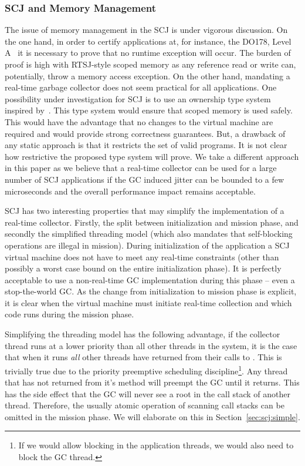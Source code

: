 \subsubsection{SCJ and Memory Management}

The issue of memory management in the SCJ is under vigorous
discussion.  On the one hand, in order to certify applications at,
for instance, the DO178, Level A~\cite{do-178b} it is necessary to
prove that no runtime exception will occur. The burden of proof is
high with RTSJ-style scoped memory as any reference read or write
can, potentially, throw a memory access exception. On the other
hand, mandating a real-time garbage collector does not seem
practical for all applications. One possibility under investigation
for SCJ is to use an ownership type system inspired
by~\cite{vee07,ecoop06}. This type system would ensure that scoped
memory is used safely. This would have the advantage that no changes
to the virtual machine are required and would provide strong
correctness guarantees. But, a drawback of any static approach is
that it restricts the set of valid programs. It is not clear how
restrictive the proposed type system will prove. We take a different
approach in this paper as we believe that a real-time collector can
be used for a large number of SCJ applications if the GC induced
jitter can be bounded to a few microseconds and the overall
performance impact remains acceptable.

SCJ has two interesting properties that may simplify the
implementation of a real-time collector. Firstly, the split between
initialization and mission phase, and secondly the simplified
threading model (which also mandates that self-blocking operations
are illegal in mission).  During initialization of the application a
SCJ virtual machine does not have to meet any real-time constraints
(other than possibly a worst case bound on the entire initialization
phase). It is perfectly acceptable to use a non-real-time GC
implementation during this phase -- even a stop-the-world GC. As the
change from initialization to mission phase is explicit, it is clear
when the virtual machine must initiate real-time collection and
which code runs during the mission phase.


Simplifying the threading model has the following advantage, if the
collector thread runs at a lower priority than all other threads in
the system, it is the case that when it runs \emph{all} other
threads have returned from their calls to . This is
trivially true due to the priority preemptive scheduling
discipline\footnote{If we would allow blocking in the application
threads, we would also need to block the GC thread.}. Any thread
that has not returned from it's  method will preempt the
GC until it returns. This has the side effect that the GC will never
see a root in the call stack of another thread. Therefore, the
usually atomic operation of scanning call stacks can be omitted in
the mission phase. We will elaborate on this in
Section~\ref{sec:scj:simple}.


